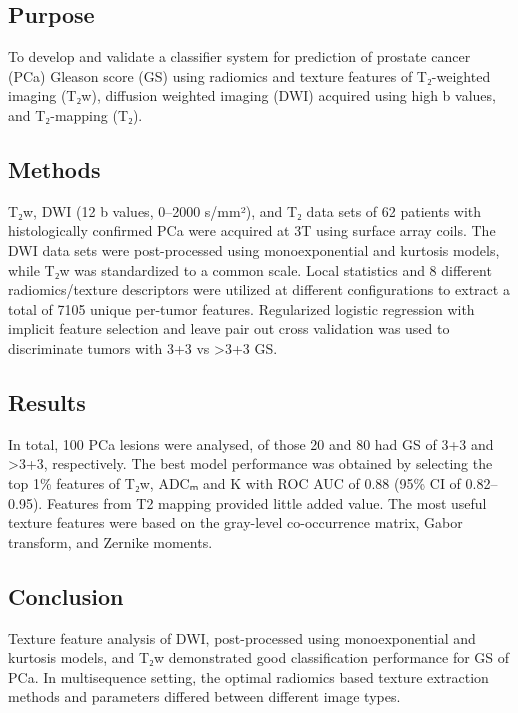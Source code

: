 
\subsection*{Purpose}

To develop and validate a classifier system for prediction of prostate cancer (PCa)
Gleason score (GS) using radiomics and texture features of T₂-weighted imaging (T₂w), diffusion
weighted imaging (DWI) acquired using high b values, and T₂-mapping (T₂).


\subsection*{Methods}

T₂w, DWI (12 b values, 0--2000 s/mm²), and T₂ data sets of 62 patients with
histologically confirmed PCa were acquired at 3T using surface array
coils. The DWI data sets were post-processed using monoexponential and kurtosis
models, while T₂w was standardized to a common scale. Local statistics and 8
different radiomics/texture descriptors were utilized at different configurations to
extract a total of 7105 unique per-tumor features. Regularized logistic
regression with implicit feature selection and leave pair out cross validation
was used to discriminate tumors with 3+3 vs >3+3 GS.


\subsection*{Results}

In total, 100 PCa lesions were analysed, of those 20 and 80 had GS of 3+3 and >3+3, respectively. The best model performance was obtained by selecting the top 1\% features of
T₂w, ADCₘ and K with ROC AUC of 0.88 (95\% CI of 0.82--0.95). Features from T2 mapping provided little added value. The most useful
texture features were based on the gray-level co-occurrence matrix, Gabor
transform, and Zernike moments.


\subsection*{Conclusion}

Texture feature analysis of DWI, post-processed using monoexponential and kurtosis models, and T₂w demonstrated good classification performance for GS of PCa. In multisequence setting, the optimal radiomics based texture extraction methods and parameters differed between different image types.
